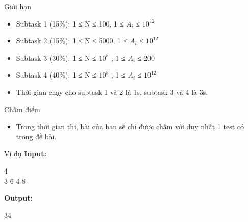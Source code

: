 Giới hạn
\begin{itemize}
	\item     Subtask 1 (15\%): 1 ≤ N ≤ 100, 1 ≤ $A_{i}$    ≤ $10^{12}$
	\item     Subtask 2 (15\%): 1 ≤ N ≤ 5000, 1 ≤ $A_{i}$    ≤ $10^{12}$
	\item     Subtask 3 (30\%): 1 ≤ N ≤ $10^{5}$    , 1 ≤ $A_{i}$    ≤ 200   
	\item     Subtask 4 (40\%): 1 ≤ N ≤ $10^{5}$    , 1 ≤ $A_{i}$    ≤ $10^{12}$
	\item     Thời gian chạy cho subtask 1 và 2 là 1s, subtask 3 và 4 là 3s.   
\end{itemize}
Chấm điểm
\begin{itemize}
	\item     Trong thời gian thi, bài của bạn sẽ chỉ được chấm với duy nhất 1 test có trong đề bài.   
\end{itemize}
Ví dụ
\textbf{    Input:   }

   4   
\\   3 6 4 8  

\textbf{    Output:   }

   34